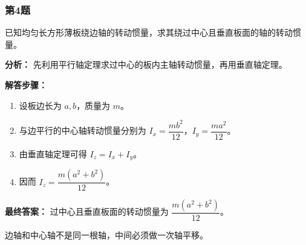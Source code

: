 \documentclass[12pt,a4paper]{ctexart}
\begin{document}
\subsubsection*{第4题}
\begin{tcolorbox}[colback=gray!2!white,colframe=black!60,title={题目}]
已知均匀长方形薄板绕边轴的转动惯量，求其绕过中心且垂直板面的轴的转动惯量。\par
\end{tcolorbox}
\begin{tcolorbox}[colback=blue!2!white,colframe=blue!55!black,title={完整答案}]
\textbf{分析：}
先利用平行轴定理求过中心的板内主轴转动惯量，再用垂直轴定理。\par
\textbf{解答步骤：}
\begin{enumerate}
\item 设板边长为 \(a,b\)，质量为 \(m\)。
\item 与边平行的中心轴转动惯量分别为 \(I_x=\dfrac{mb^2}{12}\)，\(I_y=\dfrac{ma^2}{12}\)。
\item 由垂直轴定理可得 \(I_z=I_x+I_y\)。
\item 因而 \(I_z=\dfrac{m(a^2+b^2)}{12}\)。
\end{enumerate}
\textbf{最终答案：}
过中心且垂直板面的转动惯量为 \(\dfrac{m(a^2+b^2)}{12}\)。\par
\end{tcolorbox}
\begin{tcolorbox}[colback=red!2!white,colframe=red!55!black,title={易错点}]
边轴和中心轴不是同一根轴，中间必须做一次轴平移。\par
\end{tcolorbox}
\end{document}
